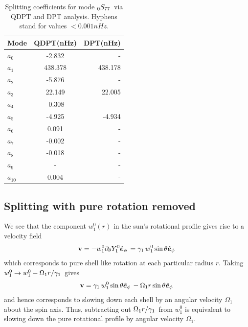 \begin{table}
\begin{center}
\begin{tabular}{|l|c|r|}
\hline
\textbf{Mode} & \textbf{QDPT(nHz)} & \textbf{DPT(nHz)} \\ \hline
$a_0$ &\hfill -2.832 & \hfill  - \\ \hline
$a_1$ & \hfill 438.378 & \hfill 438.178 \\ \hline
$a_2$ & \hfill -5.876 & \hfill - \\ \hline
$a_3$ & \hfill 22.149 & \hfill 22.005 \\ \hline
$a_4$ & \hfill -0.308 & \hfill  - \\ \hline
$a_5$ & \hfill -4.925 & \hfill -4.934 \\ \hline
$a_6$ & \hfill 0.091 & \hfill - \\ \hline
$a_7$ & \hfill -0.002 & \hfill  - \\ \hline
$a_8$ & \hfill -0.018 & \hfill - \\ \hline
$a_9$ & \hfill - & \hfill  - \\ \hline
$a_{10}$& \hfill  0.004 & \hfill  - \\ \hline
\end{tabular}
\end{center}
\caption{Splitting coefficients for mode $_{0}S_{77}\,$ via QDPT and DPT analysis. Hyphens stand for values $< 0.001nHz$.}
\label{tab:split_dr}
\end{table}

\subsection{Splitting with pure rotation removed}
We see that the component $w_1^0(r)$ in the sun's rotational profile gives rise to a velocity field
$$\mathbf{v} = -w_1^0 \partial_{\theta}Y_1^0 \hat{\bm{e}}_{\phi}\, = \gamma_{1}\,w_1^0 \sin\theta \hat{\bm{e}}_{\phi}\,$$
which corresponds to pure shell like rotation at each particular radius $r$. Taking $w_1^0 \rightarrow w_1^0 - \Omega_1 r / \gamma_{1}\,$ gives
\begin{equation}
\mathbf{v} = \gamma_{1}\,w_1^0 \sin\theta \hat{\bm{e}}_{\phi}\, - \Omega_1 r \sin\theta \hat{\bm{e}}_{\phi}\,
\end{equation}
and hence corresponds to slowing down each shell by an angular velocity $\Omega_1$ about the spin axis. Thus, subtracting out $\Omega_1 r / \gamma_{1}\,$ from $w_1^0$ is equivalent to slowing down the pure rotational profile by angular velocity $\Omega_1$.


